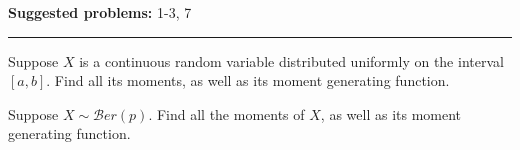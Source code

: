 \documentclass[12pt,reqno]{amsart}
\begin{document}
\textbf{Suggested problems:} 1-3, 7

\bigskip
\hrule

\bigskip
\prob Suppose $X$ is a continuous random variable distributed uniformly on the interval $[a,b]$. Find all its moments, as well as its moment generating function.

\vfill
\prob Suppose $X\sim \mathcal{B}er(p)$. Find all the moments of $X$, as well as its moment generating function.

\vfill
\end{document}
